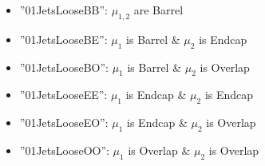 \begin{itemize}
\begin{itemize}
\begin{itemize}
          \item ''01JetsLooseBB'': $\mu_{1,2}$ are Barrel
          \item ''01JetsLooseBE'': $\mu_{1}$ is Barrel \& $\mu_2$ is Endcap
          \item ''01JetsLooseBO'': $\mu_{1}$ is Barrel \& $\mu_2$ is Overlap
          \item ''01JetsLooseEE'': $\mu_{1}$ is Endcap \& $\mu_2$ is Endcap
          \item ''01JetsLooseEO'': $\mu_{1}$ is Endcap \& $\mu_2$ is Overlap
          \item ''01JetsLooseOO'': $\mu_{1}$ is Overlap \& $\mu_2$ is Overlap
        \end{itemize}
    \end{itemize}
\end{itemize}

